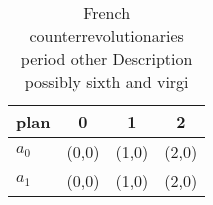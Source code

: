\documentclass[a4paper]{article}
\begin{document}
\begin{table}
\begin{adjustbox}{width=0.5\columnwidth}
\begin{tabular}{|l|l|l|l|}
\hline
\textbf{plan} & \multicolumn{1}{c|}{\textbf{0}} & \multicolumn{1}{c|}{\textbf{1}} & \multicolumn{1}{c|}{\textbf{2}} \\ \hline
\textbf{$a_0$}  & (0,0) & (1,0) & (2,0) \\ \hline
\textbf{$a_1$}  & (0,0) & (1,0) & (2,0) \\ \hline
\end{tabular}
\end{adjustbox}
\caption{French counterrevolutionaries period other Description possibly sixth and virgi
}
\end{table}
\end{document}
